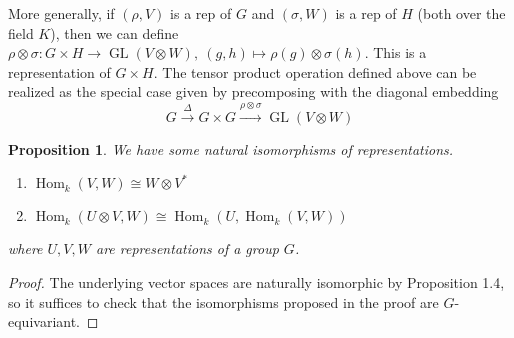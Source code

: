 \documentclass{article}
\theoremstyle{definition}
\theoremstyle{remark}
\theoremstyle{plain}
\newtheorem{prop}[defn]{Proposition}
\newcommand{\Hom}{\operatorname{Hom}}
\begin{document}
More generally, if $(\rho,V)$ is a rep of $G$ and $(\sigma, W)$ is a rep of $H$ (both over the field $K$), then we can define $\rho\otimes\sigma : G\times H\to \operatorname{GL}(V\otimes W),\ (g,h)\mapsto \rho(g)\otimes \sigma(h)$. This is a representation of $G\times H$. The tensor product operation defined above can be realized as the special case given by precomposing with the diagonal embedding
\[G\overset{\Delta}{\longrightarrow} G\times G\overset{\rho\otimes \sigma}{\longrightarrow}\operatorname{GL}(V\otimes W)\]
\begin{prop}
    We have some natural isomorphisms of representations.
    \begin{enumerate}
        \item $\Hom_k(V,W)\cong W\otimes V^\ast$
        \item $\Hom_k(U\otimes V,W)\cong\Hom_k(U,\Hom_k(V,W))$
    \end{enumerate}
    where $U,V,W$ are representations of a group $G$.
\end{prop}
\begin{proof}
    The underlying vector spaces are naturally isomorphic by Proposition 1.4, so it suffices to check that the isomorphisms proposed in the proof are $G$-equivariant.
\end{proof}
\end{document}
